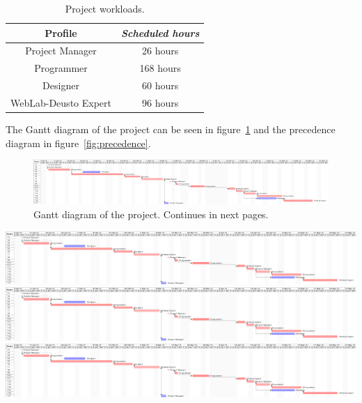 \begin{table}[h]
	\centering
	\caption{Project workloads.}\label{tab:work}
	\begin{tabular}{cc}
		\toprule
		\textbf{Profile} & \emph{Scheduled hours} \\
		\midrule
		Project Manager			&	26 hours	\\
		Programmer				&	168 hours	\\
		Designer				&	60 hours	\\
		WebLab-Deusto Expert	&	96 hours	\\
		\bottomrule
	\end{tabular}
\end{table}

The Gantt diagram of the project can be seen in figure~\ref{fig:gantt} and the precedence diagram in
figure~\ref{fig:precedence}.

\begin{figure}
	\centering
	\includegraphics[trim=0in 0in 26in 0in, clip, angle=90]{fig/gantt}
	\caption[Gantt diagram of the project.]{Gantt diagram of the project. Continues in next
	pages.}\label{fig:gantt}
\end{figure}
\clearpage
\begin{center}
	\includegraphics[trim=7.82in 0in 17in 0in, clip, angle=90]{fig/gantt}\clearpage
	\includegraphics[trim=16.82in 0in 8in 0in, clip, angle=90]{fig/gantt}\clearpage
	\includegraphics[trim=25.82in 0in 0in 0in, clip, angle=90]{fig/gantt}\clearpage
\end{center}

